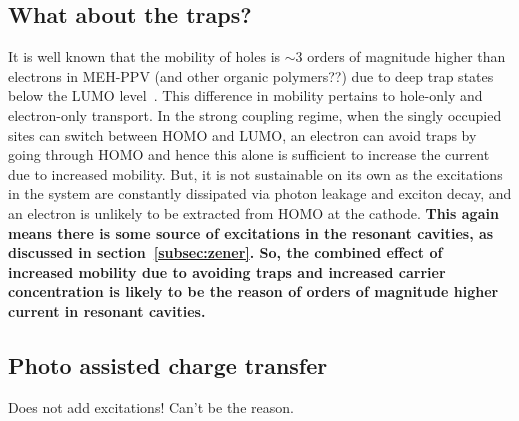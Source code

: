 \documentclass[a4paper,twocolumn]{revtex4-1} %
\begin{document}
\subsection{What about the traps?}
It is well known that the mobility of holes is $\sim 3$ orders of magnitude higher than electrons in MEH-PPV (and other organic polymers??) due to deep trap states below the LUMO level~\cite{Zhang10}.
This difference in mobility pertains to hole-only and electron-only transport.
In the strong coupling regime, when the singly occupied sites can switch between HOMO and LUMO, an electron can avoid traps by going through HOMO and hence this alone is sufficient to increase the current due to increased mobility. 
But, it is not sustainable on its own as the excitations in the system are constantly dissipated via photon leakage and exciton decay, and an electron is unlikely to be extracted from HOMO at the cathode. 
{\bf This again means there is some source of excitations in the resonant cavities, as discussed in section~\ref{subsec:zener}. 
So, the combined effect of increased mobility due to avoiding traps and increased carrier concentration is likely to be the reason of orders of magnitude higher current in resonant cavities.}

\subsection{Photo assisted charge transfer}
Does not add excitations! Can't be the reason.










\end{document}
